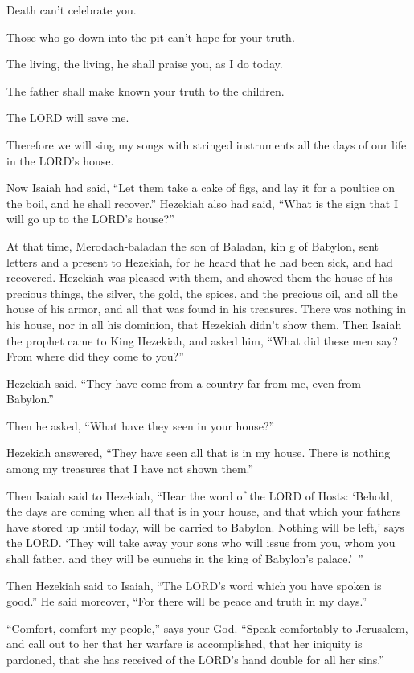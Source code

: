 Death can’t celebrate you.

Those who go down into the pit can’t hope for your truth.

\myverse{}The living, the living, he shall praise you, as I do today.

The father shall make known your truth to the children.

\myverse{}The LORD will save me.

Therefore we will sing my songs with stringed instruments all the days of our
life in the LORD’s house.

\myverse{}Now Isaiah had said, “Let them take a cake of figs, and lay
it for a poultice on the boil, and he shall recover.”
\myverse{}Hezekiah also had said, “What is the sign that I will go up to the LORD’s
house?”


\mychapter{              } \myverse*{}At that time, Merodach-baladan the son of Baladan, kin g of Babylon,
sent letters and a present to Hezekiah, for he heard that he had been sick, and had recovered.
\myverse{}Hezekiah was pleased with them, and showed them the house of his precious things,
the silver, the gold, the spices, and the precious oil, and all the house of his armor, and all that was
found in his treasures. There was nothing in his house, nor in all his dominion, that Hezekiah didn’t
show them.
\myverse{}Then Isaiah the prophet came to King Hezekiah, and asked him, “What did these
men say? From where did they come to you?”

Hezekiah said, “They have come from a country far from me, even from Babylon.”

\myverse{}Then he asked, “What have they seen in your house?”

Hezekiah answered, “They have seen all that is in my house. There is nothing among my treasures
that I have not shown them.”

\myverse{}Then Isaiah said to Hezekiah, “Hear the word of the LORD of Hosts:
\myverse{}‘Behold, the days are coming when all that is in your house, and that which
your fathers have stored up until today, will be carried to Babylon. Nothing will be left,’ says the LORD.
\myverse{}‘They will take away your sons who will issue from you, whom you shall father,
and they will be eunuchs in the king of Babylon’s palace.’ ”

\myverse{}Then Hezekiah said to Isaiah, “The LORD’s word which you have
spoken is good.” He said moreover, “For there will be peace and truth in my days.”


\mychapter{} \myverse*{}“Comfort, comfort my people,” says your God.
\myverse{}“Speak comfortably to Jerusalem, and call out to her that her warfare is accomplished,
that her iniquity is pardoned, that she has received of the LORD’s hand double for all her sins.”

